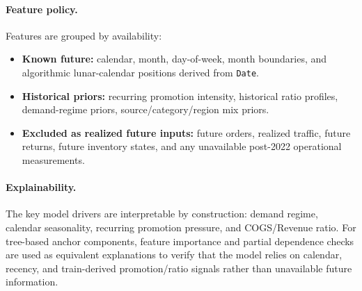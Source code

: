 \paragraph{Feature policy.}
Features are grouped by availability:
\begin{itemize}
  \item \textbf{Known future:} calendar, month, day-of-week, month boundaries, and algorithmic lunar-calendar positions derived from \texttt{Date}.
  \item \textbf{Historical priors:} recurring promotion intensity, historical ratio profiles, demand-regime priors, source/category/region mix priors.
  \item \textbf{Excluded as realized future inputs:} future orders, realized traffic, future returns, future inventory states, and any unavailable post-2022 operational measurements.
\end{itemize}

\paragraph{Explainability.}
The key model drivers are interpretable by construction: demand regime, calendar seasonality, recurring promotion pressure, and COGS/Revenue ratio. For tree-based anchor components, feature importance and partial dependence checks are used as equivalent explanations to verify that the model relies on calendar, recency, and train-derived promotion/ratio signals rather than unavailable future information.
